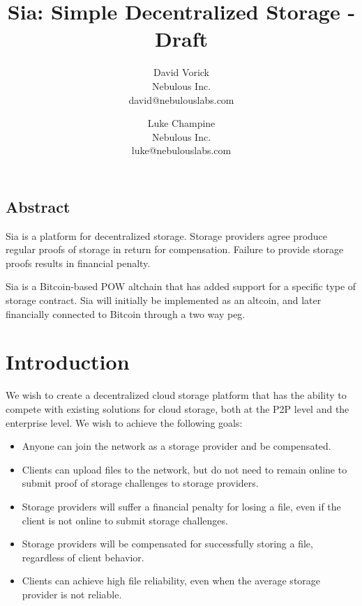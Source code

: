 \documentclass[twocolumn]{article}
\begin{document}
\frenchspacing

\title{Sia: Simple Decentralized Storage - Draft}

\author{
{\rm David Vorick}\\
Nebulous Inc.\\
david@nebulouslabs.com
\and
{\rm Luke Champine}\\
Nebulous Inc.\\
luke@nebulouslabs.com
}

\maketitle

\subsection*{Abstract}
Sia is a platform for decentralized storage.
Storage providers agree produce regular proofs of storage in return for compensation.
Failure to provide storage proofs results in financial penalty.

Sia is a Bitcoin-based POW altchain that has added support for a specific type of storage contract.
Sia will initially be implemented as an altcoin, and later financially connected to Bitcoin through a two way peg.

\section{Introduction}
We wish to create a decentralized cloud storage platform that has the ability to compete with existing solutions for cloud storage, both at the P2P level and the enterprise level.
We wish to achieve the following goals:
\begin{itemize}
	\item Anyone can join the network as a storage provider and be compensated.
	\item Clients can upload files to the network, but do not need to remain online to submit proof of storage challenges to storage providers.
	\item Storage providers will suffer a financial penalty for losing a file, even if the client is not online to submit storage challenges.
	\item Storage providers will be compensated for successfully storing a file, regardless of client behavior.
	\item Clients can achieve high file reliability, even when the average storage provider is not reliable.
\end{itemize}
\end{document}
